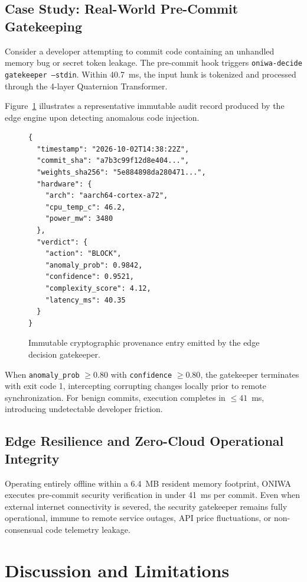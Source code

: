 \documentclass[10pt,twocolumn,letterpaper]{article}
\begin{document}
\subsection{Case Study: Real-World Pre-Commit Gatekeeping}
Consider a developer attempting to commit code containing an unhandled memory bug or secret token leakage. The pre-commit hook triggers \texttt{oniwa-decide gatekeeper --stdin}. Within 40.7~ms, the input hunk is tokenized and processed through the 4-layer Quaternion Transformer.

Figure~\ref{fig:ledger_example} illustrates a representative immutable audit record produced by the edge engine upon detecting anomalous code injection.

\begin{figure}[htbp]
\begin{lstlisting}
{
  "timestamp": "2026-10-02T14:38:22Z",
  "commit_sha": "a7b3c99f12d8e404...",
  "weights_sha256": "5e884898da280471...",
  "hardware": {
    "arch": "aarch64-cortex-a72",
    "cpu_temp_c": 46.2,
    "power_mw": 3480
  },
  "verdict": {
    "action": "BLOCK",
    "anomaly_prob": 0.9842,
    "confidence": 0.9521,
    "complexity_score": 4.12,
    "latency_ms": 40.35
  }
}
\end{lstlisting}
\caption{Immutable cryptographic provenance entry emitted by the edge decision gatekeeper.}
\label{fig:ledger_example}
\end{figure}

When \texttt{anomaly\_prob} $\ge 0.80$ with \texttt{confidence} $\ge 0.80$, the gatekeeper terminates with exit code 1, intercepting corrupting changes locally prior to remote synchronization. For benign commits, execution completes in $\le 41$~ms, introducing undetectable developer friction.

\subsection{Edge Resilience and Zero-Cloud Operational Integrity}
Operating entirely offline within a 6.4~MB resident memory footprint, ONIWA executes pre-commit security verification in under 41~ms per commit. Even when external internet connectivity is severed, the security gatekeeper remains fully operational, immune to remote service outages, API price fluctuations, or non-consensual code telemetry leakage.

\section{Discussion and Limitations}
\end{document}
